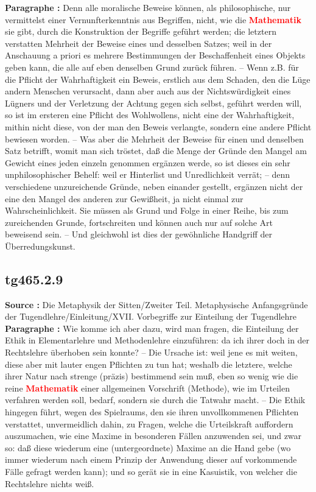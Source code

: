 \documentclass[a4paper,12pt,twoside]{book}
\newcommand{\match}[1]{\textcolor{red}{\textbf{#1}}}
\begin{document}
	\textbf{Paragraphe : }Denn alle moralische Beweise können, als philosophische, nur vermittelst einer Vernunfterkenntnis aus Begriffen, nicht, wie die \match{Mathematik} sie gibt, durch die Konstruktion der Begriffe geführt werden; die letztern verstatten Mehrheit  der Beweise eines und desselben Satzes; weil in der Anschauung a priori es mehrere Bestimmungen der Beschaffenheit eines Objekts geben kann, die alle auf eben denselben Grund zurück führen. – Wenn z.B. für die Pflicht der Wahrhaftigkeit ein Beweis, erstlich aus dem Schaden, den die Lüge andern Menschen verursacht, dann aber auch aus der Nichtswürdigkeit eines Lügners und der Verletzung der Achtung gegen sich selbst, geführt werden will, so ist im ersteren eine Pflicht des Wohlwollens, nicht eine der Wahrhaftigkeit, mithin nicht diese, von der man den Beweis verlangte, sondern eine andere Pflicht bewiesen worden. – Was aber die Mehrheit der Beweise für einen und denselben Satz betrifft, womit man sich tröstet, daß die Menge der Gründe den Mangel am Gewicht eines jeden einzeln genommen ergänzen werde, so ist dieses ein sehr unphilosophischer Behelf: weil er Hinterlist und Unredlichkeit verrät; – denn verschiedene unzureichende Gründe, neben einander gestellt, ergänzen nicht der eine den Mangel des anderen zur Gewißheit, ja nicht einmal zur Wahrscheinlichkeit. Sie müssen als Grund und Folge in einer Reihe, bis zum zureichenden Grunde, fortschreiten und können auch nur auf solche Art beweisend sein. – Und gleichwohl ist dies der gewöhnliche Handgriff der Überredungskunst. 
	
	\subsection*{tg465.2.9} 
	\textbf{Source : }Die Metaphysik der Sitten/Zweiter Teil. Metaphysische Anfangsgründe der Tugendlehre/Einleitung/XVII. Vorbegriffe zur Einteilung der Tugendlehre\\  
	
	\textbf{Paragraphe : }Wie komme ich aber dazu, wird man fragen, die Einteilung der Ethik in Elementarlehre und Methodenlehre einzuführen: da ich ihrer doch in der Rechtslehre überhoben sein konnte? – Die Ursache ist: weil jene es mit weiten, diese aber mit lauter engen Pflichten zu tun hat; weshalb die letztere, welche ihrer Natur nach strenge (präzis) bestimmend sein muß, eben so wenig wie die reine \match{Mathematik} einer allgemeinen Vorschrift (Methode), wie im Urteilen verfahren werden soll, bedarf, sondern sie durch die Tatwahr macht. – Die Ethik hingegen führt, wegen des Spielraums, den sie ihren unvollkommenen Pflichten verstattet, unvermeidlich dahin, zu Fragen, welche die Urteilskraft auffordern auszumachen, wie eine Maxime in besonderen Fällen anzuwenden sei, und zwar so: daß diese wiederum eine (untergeordnete) Maxime an die Hand gebe (wo immer wiederum nach einem Prinzip der Anwendung dieser auf vorkommende Fälle gefragt werden kann); und so gerät sie in eine Kasuistik, von welcher die Rechtslehre nichts weiß. 
	
\end{document}
